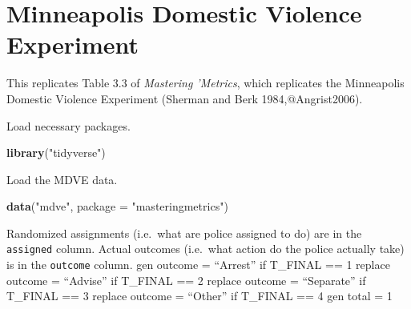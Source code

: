 \documentclass[]{book}
\newenvironment{Shaded}{\begin{snugshade}}{\end{snugshade}}
\newcommand{\DataTypeTok}[1]{\textcolor[rgb]{0.13,0.29,0.53}{#1}}
\newcommand{\KeywordTok}[1]{\textcolor[rgb]{0.13,0.29,0.53}{\textbf{#1}}}
\newcommand{\NormalTok}[1]{#1}
\newcommand{\StringTok}[1]{\textcolor[rgb]{0.31,0.60,0.02}{#1}}
\theoremstyle{definition}
\theoremstyle{definition}
\theoremstyle{definition}
\theoremstyle{remark}
\begin{document}
\hypertarget{minneapolis-domestic-violence-experiment}{%
\chapter{Minneapolis Domestic Violence
Experiment}\label{minneapolis-domestic-violence-experiment}}

This replicates Table 3.3 of \emph{Mastering 'Metrics}, which replicates
the Minneapolis Domestic Violence Experiment (Sherman and Berk
1984,@Angrist2006).

Load necessary packages.

\begin{Shaded}
\begin{Highlighting}[]
\KeywordTok{library}\NormalTok{(}\StringTok{"tidyverse"}\NormalTok{)}
\end{Highlighting}
\end{Shaded}

Load the MDVE data.

\begin{Shaded}
\begin{Highlighting}[]
\KeywordTok{data}\NormalTok{(}\StringTok{"mdve"}\NormalTok{, }\DataTypeTok{package =} \StringTok{"masteringmetrics"}\NormalTok{)}
\end{Highlighting}
\end{Shaded}

Randomized assignments (i.e.~what are police assigned to do) are in the
\texttt{assigned} column. Actual outcomes (i.e.~what action do the
police actually take) is in the \texttt{outcome} column. gen outcome =
``Arrest'' if T\_FINAL == 1 replace outcome = ``Advise'' if T\_FINAL ==
2 replace outcome = ``Separate'' if T\_FINAL == 3 replace outcome =
``Other'' if T\_FINAL == 4 gen total = 1
\end{document}
